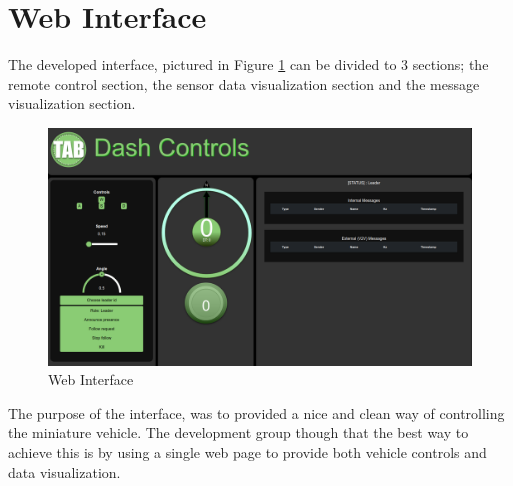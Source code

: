 \documentclass[12pt]{article}
\begin{document}
\tableofcontents
\pagebreak

\section{Web Interface}
The developed interface, pictured in Figure \ref{fig:interface} can be divided to 3 sections; the remote control section, the sensor data visualization section and the message visualization section. \par
\FloatBarrier %
\begin{figure}[ht!]
\centering
\includegraphics[width=\linewidth]{Images/whole_view.png}
\caption{Web Interface}
\label{fig:interface}
\end{figure}
\FloatBarrier %

The purpose of the interface, was to provided a nice and clean way of controlling the miniature vehicle. The development group though that the best way to achieve this is by using a single web page to provide both vehicle controls and data visualization.

\end{document}
